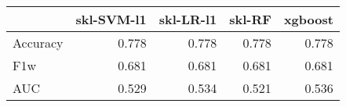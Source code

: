 \begin{tabular}{lrrrr}
\toprule
{} &  skl-SVM-l1 &  skl-LR-l1 &  skl-RF &  xgboost \\
\midrule
Accuracy &       0.778 &      0.778 &   0.778 &    0.778 \\
F1w      &       0.681 &      0.681 &   0.681 &    0.681 \\
AUC      &       0.529 &      0.534 &   0.521 &    0.536 \\
\bottomrule
\end{tabular}
